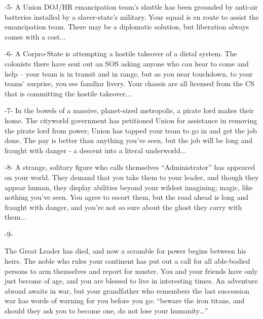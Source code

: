                                                      -5-  
A Union DOJ/HR emancipation team’s shuttle has been grounded by anti-air batteries installed by  
a slaver-state’s military. Your squad is en route to assist the emancipation team. There may be a  
diplomatic solution, but liberation always comes with a cost...  

                                                     -6-  
A Corpro-State is attempting a hostile takeover of a distal system. The colonists there have sent  
out an SOS asking anyone who can hear to come and help -- your team is in transit and in range,  
but as you near touchdown, to your teams’ surprise, you see familiar livery. Your chassis are all  
licensed from the CS that is committing the hostile takeover...  

                                                     -7-  
In the bowels of a massive, planet-sized metropolis, a pirate lord makes their home. The cityworld  
government has petitioned Union for assistance in removing the pirate lord from power; Union  
has tapped your team to go in and get the job done. The pay is better than anything you’ve seen,  
but the job will be long and fraught with danger - a descent into a literal underworld...  

                                                     -8-  
A strange, solitary figure who calls themselves “Administrator” has appeared on your world. They  
demand that you take them to your leader, and though they appear human, they display abilities  
beyond your wildest imagining; magic, like nothing you’ve seen. You agree to escort them, but  
the road ahead is long and fraught with danger, and you’re not so sure about the ghost they carry  
with them...    

                                                     -9-  

                                                                                                          


The Great Leader has died, and now a scramble for power begins between his heirs. The noble  
who rules your continent has put out a call for all able-bodied persons to arm themselves and  
report for muster. You and your friends have only just become of age, and you are blessed to live  
in interesting times. An adventure abroad awaits in war, but your grandfather who remembers the  
last succession war has words of warning for you before you go: “beware the iron titans, and  
should they ask you to become one, do not lose your humanity…”   

